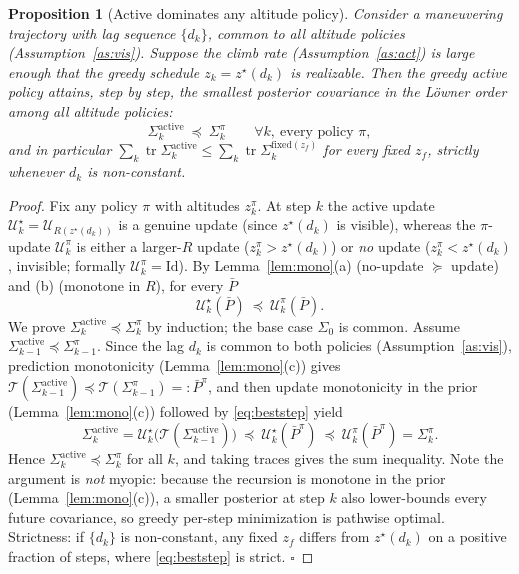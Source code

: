 \documentclass[10pt]{article}
\newtheorem{proposition}{Proposition}
\theoremstyle{remark}\newtheorem{remark}{Remark}
\DeclareMathOperator{\tr}{tr}
\newcommand{\zstar}{z^{\star}}
\begin{document}
\begin{proposition}[Active dominates any altitude policy]\label{prop:B}
Consider a maneuvering trajectory with lag sequence $\{d_k\}$, common to all altitude policies
(Assumption~\ref{as:vis}). Suppose the climb rate (Assumption~\ref{as:act}) is large enough that
the greedy schedule $z_k=\zstar(d_k)$ is realizable. Then the greedy active policy attains,
step by step, the smallest posterior covariance in the L\"owner order among \emph{all} altitude
policies:
\[
\Sigma^{\mathrm{active}}_k\ \preceq\ \Sigma^{\pi}_k\qquad\forall k,\ \text{every policy }\pi,
\]
and in particular
$\sum_k\tr\Sigma^{\mathrm{active}}_k\le\sum_k\tr\Sigma^{\mathrm{fixed}(z_f)}_k$ for every fixed
$z_f$, strictly whenever $d_k$ is non-constant.
\end{proposition}
\begin{proof}
Fix any policy $\pi$ with altitudes $z^\pi_k$. At step $k$ the active update
$\mathcal U^{\star}_k=\mathcal U_{R(\zstar(d_k))}$ is a genuine update (since $\zstar(d_k)$ is
visible), whereas the $\pi$-update $\mathcal U^{\pi}_k$ is either a larger-$R$ update
($z^\pi_k>\zstar(d_k)$) or \emph{no} update ($z^\pi_k<\zstar(d_k)$, invisible; formally
$\mathcal U^{\pi}_k=\mathrm{Id}$). By Lemma~\ref{lem:mono}(a) (no-update $\succeq$ update) and
(b) (monotone in $R$), for every $\bar P$
\begin{equation}\label{eq:beststep}
\mathcal U^{\star}_k(\bar P)\ \preceq\ \mathcal U^{\pi}_k(\bar P).
\end{equation}
We prove $\Sigma^{\mathrm{active}}_k\preceq\Sigma^{\pi}_k$ by induction; the base case
$\Sigma_0$ is common. Assume $\Sigma^{\mathrm{active}}_{k-1}\preceq\Sigma^{\pi}_{k-1}$. Since the
lag $d_k$ is common to both policies (Assumption~\ref{as:vis}), prediction monotonicity
(Lemma~\ref{lem:mono}(c)) gives
$\mathcal T(\Sigma^{\mathrm{active}}_{k-1})\preceq\mathcal T(\Sigma^{\pi}_{k-1})=:\bar P^{\pi}$,
and then update monotonicity in the prior (Lemma~\ref{lem:mono}(c)) followed by
\eqref{eq:beststep} yield
\[
\Sigma^{\mathrm{active}}_k=\mathcal U^{\star}_k\!\big(\mathcal T(\Sigma^{\mathrm{active}}_{k-1})\big)
\ \preceq\ \mathcal U^{\star}_k(\bar P^{\pi})\ \preceq\ \mathcal U^{\pi}_k(\bar P^{\pi})=\Sigma^{\pi}_k .
\]
Hence $\Sigma^{\mathrm{active}}_k\preceq\Sigma^{\pi}_k$ for all $k$, and taking traces gives the
sum inequality. Note the argument is \emph{not} myopic: because the recursion is monotone in the
prior (Lemma~\ref{lem:mono}(c)), a smaller posterior at step $k$ also lower-bounds every future
covariance, so greedy per-step minimization is pathwise optimal. Strictness: if $\{d_k\}$ is
non-constant, any fixed $z_f$ differs from $\zstar(d_k)$ on a positive fraction of steps, where
\eqref{eq:beststep} is strict. $\square$
\end{proof}
\end{document}
